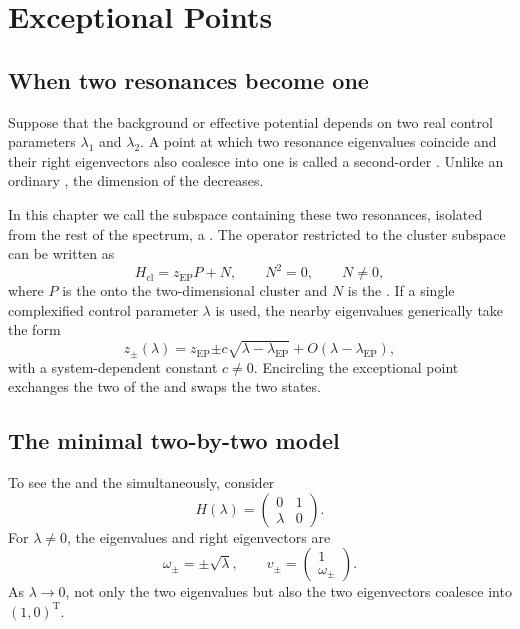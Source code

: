 \chapter{Exceptional Points}
\label{chap:exceptional-points}

\section{When two resonances become one}

Suppose that the background or effective potential depends on two real control parameters $\lambda_1$ and $\lambda_2$. A point at which two resonance eigenvalues coincide and their right eigenvectors also coalesce into one is called a second-order . Unlike an ordinary , the dimension of the  decreases.

In this chapter we call the subspace containing these two resonances, isolated from the rest of the spectrum, a . The operator restricted to the cluster subspace can be written as
\begin{equation}
H_{\mathrm{cl}}
=
z_{\mathrm{EP}}P+N,
\qquad
N^2=0,
\qquad
N\ne0,
\label{eq:ep-jordan-form}
\end{equation}
where $P$ is the  onto the two-dimensional cluster and $N$ is the . If a single complexified control parameter $\lambda$ is used, the nearby eigenvalues generically take the form
\begin{equation}
z_\pm(\lambda)
=
z_{\mathrm{EP}}
\mathord{\pm}
c\sqrt{\lambda-\lambda_{\mathrm{EP}}}
+O(\lambda-\lambda_{\mathrm{EP}}),
\label{eq:ep-puiseux}
\end{equation}
with a system-dependent constant $c\ne0$. Encircling the exceptional point exchanges the two  of the  and swaps the two states.

\section{The minimal two-by-two model}

To see the  and the  simultaneously, consider
\begin{equation}
H(\lambda)
=
\begin{pmatrix}
0&1\\
\lambda&0
\end{pmatrix}.
\label{eq:ep-two-by-two-model}
\end{equation}
For $\lambda\ne0$, the eigenvalues and right eigenvectors are
\begin{equation}
\omega_\pm
=
\mathord{\pm}\sqrt{\lambda},
\qquad
v_\pm
=
\begin{pmatrix}
1\\
\omega_\pm
\end{pmatrix}.
\end{equation}
As $\lambda\to0$, not only the two eigenvalues but also the two eigenvectors coalesce into $(1,0)^{\mathrm T}$.

